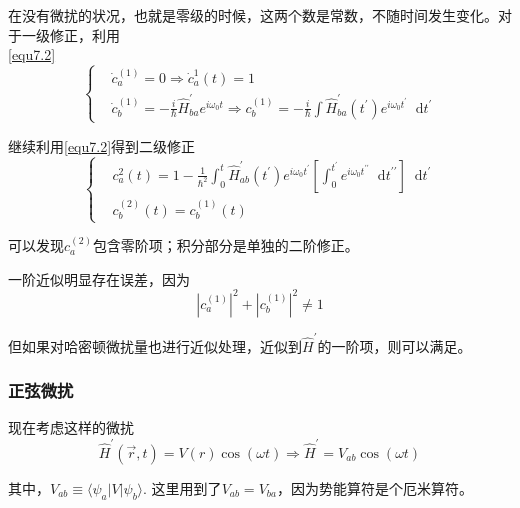 \documentclass[UTF8]{ctexart}
\newcommand*{\dif}{\mathop{}\!\mathrm{d}}
\begin{document}
\noindent 在没有微扰的状况，也就是零级的时候，这两个数是常数，不随时间发生变化。对于一级修正，利用\\
\autoref{equ7.2}
\begin{equation}
    \left\{\begin{aligned}
        &\dot{c}_a^{(1)} = 0 \Rightarrow \dot{c}_a^{1}(t) = 1 \\
        & \dot{c}_b^{(1)} = - \frac{i}{\hbar} \hat{H}_{ba}^{\prime} e^{i\omega_0 t} \Rightarrow c_b^{(1)}= -\frac{i}{\hbar} \int \hat{H}_{ba}^{\prime}(t^{\prime}) e^{i\omega_0 t^{\prime}} \dif t^{\prime}
    \end{aligned}\right.
\end{equation}

\noindent 继续利用\autoref{equ7.2}得到二级修正
\begin{equation}
    \left\{\begin{aligned}
        &c_a^{2}(t) = 1 - \frac{1}{\hbar^2} \int_{0}^{t} \hat{H}^{\prime}_{ab}(t^{\prime}) e^{i\omega_0 t^{\prime}}\left[\int_{0}^{t^{\prime}}e^{i \omega_0 t^{\prime \prime}}\dif t^{\prime \prime}\right] \dif t^{\prime}\\
        &c_b^{(2)}(t) = c_b^{(1)}(t)
    \end{aligned}\right.
\end{equation}

\noindent 可以发现$c_a^{(2)}$包含零阶项；积分部分是单独的二阶修正。

    一阶近似明显存在误差，因为
    \begin{equation}
        |c_a^{(1)}|^2 + |c_b^{(1)}|^2 \ne 1
    \end{equation}

\noindent 但如果对哈密顿微扰量也进行近似处理，近似到$\hat{H}^{\prime}$的一阶项，则可以满足。

    \subsubsection{正弦微扰}
    现在考虑这样的微扰
    \begin{equation}
        \hat{H}^{\prime}(\vec{r},t) = V(r) \cos (\omega t) \Rightarrow \hat{H}^{\prime} = V_{ab}\cos (\omega t)
    \end{equation}

\noindent 其中，$V_{ab} \equiv \langle \psi_a | V | \psi_b \rangle $. 这里用到了$V_{ab}= V_{ba}$，因为势能算符是个厄米算符。
\end{document}
